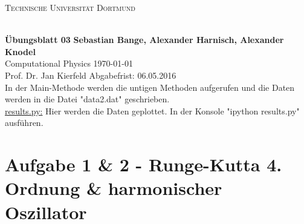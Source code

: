 
\newcommand\OverfullCenter[1]{\noindent\makebox[\linewidth]{#1}}

\noindent
\centerline{\small{\textsc{Technische Universität Dortmund}}} \\
\large\textbf{Übungsblatt 03} \hfill \footnotesize\textbf{Sebastian Bange, Alexander Harnisch, Alexander Knodel} \\
\normalsize Computational Physics \hfill \today \\
Prof. Dr. Jan Kierfeld \hfill Abgabefrist: 06.05.2016\\
\noindent\makebox[\linewidth]{\rule{\textwidth}{0.4pt}}
In der Main-Methode werden die untigen Methoden aufgerufen und die Daten werden in die Datei "data2.dat" geschrieben. \\
\underline{results.py:}
Hier werden die Daten geplottet. In der Konsole "ipython results.py" ausführen.
\section*{Aufgabe 1 \& 2 - Runge-Kutta 4. Ordnung \& harmonischer Oszillator}
